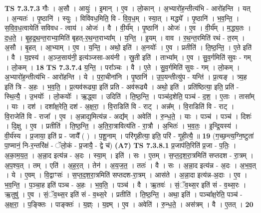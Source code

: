 \documentclass[17pt]{extarticle}
\begin{document}
                  \newline
                                \textbf{ TS 7.3.7.3} \newline
                  गौः । अ॒सौ । आयुः॑ । इ॒मान् । ए॒व । लो॒कान् । अ॒भ्यारो॑ह॒न्तीत्य॑भि - आरो॑हन्ति । यत् । अ॒न्यतः॑ । पृ॒ष्ठानि॑ । स्युः । विवि॑वध॒मिति॒ वि - वि॒व॒ध॒म् । स्या॒त् । मद्ध्ये᳚ । पृ॒ष्ठानि॑ । भ॒व॒न्ति॒ । स॒वि॒व॒ध॒त्वायेति॑ सविवध - त्वाय॑ । ओजः॑ । वै । वी॒र्य᳚म् । पृ॒ष्ठानि॑ । ओजः॑ । ए॒व । वी॒र्य᳚म् । म॒द्ध्य॒तः । द॒ध॒ते॒ । बृ॒ह॒द्र॒थ॒न्त॒राभ्या॒मिति॑ बृहत्-र॒थ॒न्त॒राभ्या᳚म् । य॒न्ति॒ । इ॒यम् । वाव । र॒थ॒न्त॒रमिति॑ रथं - त॒रम् । अ॒सौ । बृ॒हत् । आ॒भ्याम् । ए॒व । य॒न्ति॒ । अथो॒ इति॑ । अ॒नयोः᳚ । ए॒व । प्रतीति॑ । ति॒ष्ठ॒न्ति॒ । ए॒ते इति॑ । वै । य॒ज्ञ्स्य॑ । अ॒ञ्ज॒साय॑नी॒ इत्य॑ञ्जसा-अय॑नी । स्रु॒ती इति॑ । ताभ्या᳚म् । ए॒व । सु॒व॒र्गमिति॑ सुवः - गम् । लो॒कम् । \textbf{  18} \newline
                  \newline
                                \textbf{ TS 7.3.7.4} \newline
                  य॒न्ति॒ । परा᳚ञ्चः । वै । ए॒ते । सु॒व॒र्गमिति॑ सुवः - गम् । लो॒कम् । अ॒भ्यारो॑ह॒न्तीत्य॑भि - आरो॑हन्ति । ये । प॒रा॒चीना॑नि । पृ॒ष्ठानि॑ । उ॒प॒यन्तीत्यु॑प - यन्ति॑ । प्र॒त्यङ् । त्र्य॒ह इति॑ त्रि - अ॒हः । भ॒व॒ति॒ । प्र॒त्यव॑रूढ्या॒ इति॑ प्रति - अव॑रूढ्यै । अथो॒ इति॑ । प्रति॑ष्ठित्या॒ इति॒ प्रति॑ - स्थि॒त्यै॒ । उ॒भयोः᳚ । लो॒कयोः᳚ । ऋ॒द्ध्वा । उदिति॑ । ति॒ष्ठ॒न्ति॒ । पञ्च॑द॒शेति॒ पञ्च॑ - द॒श॒ । ए॒ताः । तासा᳚म् । याः । दश॑ । दशा᳚क्ष॒रेति॒ दश॑ - अ॒क्ष॒रा॒ । वि॒राडिति॑ वि - राट् । अन्न᳚म् । वि॒राडिति॑ वि - राट् । वि॒राजेति॑ वि - राजा᳚ । ए॒व । अ॒न्नाद्य॒मित्य॑न्न - अद्य᳚म् । अवेति॑ । रु॒न्ध॒ते॒ । याः । पञ्च॑ । पञ्च॑ । दिशः॑ । दि॒क्षु । ए॒व । प्रतीति॑ । ति॒ष्ठ॒न्ति॒ । अ॒ति॒रा॒त्रावित्य॑ति - रा॒त्रौ । अ॒भितः॑ । भ॒व॒तः॒ । इ॒न्द्रि॒यस्य॑ । वी॒र्य॑स्य । प्र॒जाया॒ इति॑ प्र - जायै᳚ ( ) । प॒शू॒नाम् । परि॑गृहीत्या॒ इति॒ परि॑ - गृ॒ही॒त्यै॒ ॥ \textbf{  19 } \newline
                  \newline
                      (ग॒च्छ॒न्त्य॒ग्नि॒ष्टुता॑ पा॒प्मानं॒ नि-र॒न्तरि॑क्षं - ॅलो॒कं - प्र॒जायै॒ - द्वे च॑)  \textbf{(A7)} \newline \newline
                                \textbf{ TS 7.3.8.1} \newline
                  प्र॒जाप॑ति॒रिति॑ प्र॒जा - प॒तिः॒ । अ॒का॒म॒य॒त॒ । अ॒न्ना॒द इत्य॑न्न - अ॒दः । स्या॒म् । इति॑ । सः । ए॒तम् । स॒प्त॒द॒श॒रा॒त्रमिति॑ सप्तदश - रा॒त्रम् । अ॒प॒श्य॒त् । तम् । एति॑ । अ॒ह॒र॒त् । तेन॑ । अ॒य॒ज॒त॒ । ततः॑ । वै । सः । अ॒न्ना॒द इत्य॑न्न - अ॒दः । अ॒भ॒व॒त् । ये । ए॒वम् । वि॒द्वाꣳसः॑ । स॒प्त॒द॒श॒रा॒त्रमिति॑ सप्तदश-रा॒त्रम् । आस॑ते । अ॒न्ना॒दा इत्य॑न्न-अ॒दाः । ए॒व । भ॒व॒न्ति॒ । प॒ञ्चा॒ह इति॑ पञ्च - अ॒हः । भ॒व॒ति॒ । पञ्च॑ । वै । ऋ॒तवः॑ । सं॒ॅव॒थ्स॒र इति॑ सं - व॒थ्स॒रः । ऋ॒तुषु॑ । ए॒व । सं॒ॅव॒थ्स॒र इति॑ सं - व॒थ्स॒रे । प्रतीति॑ । ति॒ष्ठ॒न्ति॒ । अथा॒ इति॑ । पञ्चा᳚क्ष॒रेति॒ पञ्च॑ - अ॒क्ष॒रा॒ । प॒ङ्क्तिः । पाङ्क्तः॑ । य॒ज्ञ्ः । य॒ज्ञ्म् । ए॒व । अवेति॑ । रु॒न्ध॒ते॒ । अस॑त्रम् । वै । ए॒तत् । \textbf{  20} \newline
\end{document}
